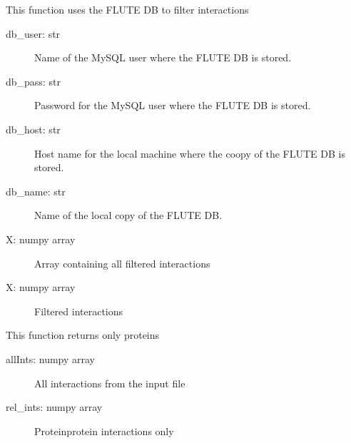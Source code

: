 \documentclass[a4paper,10pt,english]{sphinxmanual}
\begin{document}
\begin{fulllineitems}
\label{\detokenize{run_FLUTE:run_FLUTE.findInts}}
\sphinxAtStartPar
This function uses the FLUTE DB to filter interactions
\begin{description}
\item[{db\_user: str}] \leavevmode
\sphinxAtStartPar
Name of the MySQL user where the FLUTE DB is stored.

\item[{db\_pass: str}] \leavevmode
\sphinxAtStartPar
Password for the MySQL user where the FLUTE DB is stored.

\item[{db\_host: str }] \leavevmode
\sphinxAtStartPar
Host name for the local machine where the coopy of the FLUTE DB is stored.

\item[{db\_name: str}] \leavevmode
\sphinxAtStartPar
Name of the local copy of the FLUTE DB.

\item[{X: numpy array}] \leavevmode
\sphinxAtStartPar
Array containing all filtered interactions

\end{description}
\begin{description}
\item[{X: numpy array}] \leavevmode
\sphinxAtStartPar
Filtered interactions

\end{description}

\end{fulllineitems}


\begin{fulllineitems}
\label{\detokenize{run_FLUTE:run_FLUTE.uniOnly}}
\sphinxAtStartPar
This function returns only proteins
\begin{description}
\item[{allInts: numpy array}] \leavevmode
\sphinxAtStartPar
All interactions from the input file

\end{description}
\begin{description}
\item[{rel\_ints: numpy array}] \leavevmode
\sphinxAtStartPar
Protein\sphinxhyphen{}protein interactions only

\end{description}

\end{fulllineitems}
\end{document}

